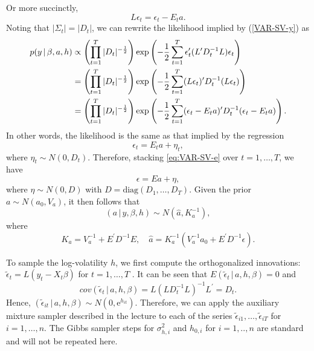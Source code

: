\documentclass{article}
\begin{document}
Or more succinctly, 
\begin{equation*}
L\epsilon _{t}=\epsilon _{t}-E_{t}a.
\end{equation*}%
Noting that $|\Sigma _{t}|=|D_{t}|$, we can rewrite the likelihood implied
by (\ref{VAR-SV-y}) as 
\begin{align*}
p(y\,|\,\beta ,a,h)& \propto \left( \prod_{t=1}^{T}|D_{t}|^{-\frac{1}{2}%
}\right) \exp \left( -\frac{1}{2}\sum_{t=1}^{T}\epsilon _{t}^{\prime
}(L^{\prime }D_{t}^{-1}L)\epsilon _{t}\right) \\
& =\left( \prod_{t=1}^{T}|D_{t}|^{-\frac{1}{2}}\right) \exp \left( -\frac{1}{%
2}\sum_{t=1}^{T}(L\epsilon _{t})^{\prime }D_{t}^{-1}(L\epsilon _{t})\right)
\\
& =\left( \prod_{t=1}^{T}|D_{t}|^{-\frac{1}{2}}\right) \exp \left( -\frac{1}{%
2}\sum_{t=1}^{T}(\epsilon _{t}-E_{t}a)^{\prime }D_{t}^{-1}(\epsilon
_{t}-E_{t}a)\right) .
\end{align*}%
In other words, the likelihood is the same as that implied by the regression 
\begin{equation}
\epsilon _{t}=E_{t}a+\eta _{t},  \label{eq:VAR-SV-e}
\end{equation}%
where $\eta _{t}\sim N(0,D_{t}).$ Therefore, stacking \eqref{eq:VAR-SV-e}
over $t=1,\ldots ,T$, we have 
\begin{equation*}
\epsilon =Ea+\eta ,
\end{equation*}%
where $\eta \sim N(0,D)$ with $D=\text{diag}(D_{1},\ldots ,D_{T})$. Given
the prior $a\sim N(a_{0},V_{a})$, it then follows that 
\begin{equation*}
(a\,|\,y,\beta ,h)\sim N(\hat{a},K_{a}^{-1}),
\end{equation*}%
where 
\begin{equation*}
K_{a}=V_{a}^{-1}+E^{\prime }D^{-1}E,\quad \hat{a}=K_{a}^{-1}\left(
V_{a}^{-1}a_{0}+E^{\prime }D^{-1}\epsilon \right) .
\end{equation*}

To sample the log-volatility $h$, we first compute the orthogonalized
innovations: $\tilde{\epsilon}_{t}=L(y_{t}-X_{t}\beta )$ for $t=1,\ldots ,T$%
. It can be seen that $E(\tilde{\epsilon}_{t}\,|\,a,h,\beta )=0$ and 
\begin{equation*}
cov(\tilde{\epsilon}_{t}\,|\,a,h,\beta )=L(LD_{t}^{-1}L)^{-1}L^{\prime
}=D_{t}.
\end{equation*}%
Hence, $(\tilde{\epsilon}_{it}\,|\,a,h,\beta )\sim N(0,\text{e}^{h_{it}}).$
Therefore, we can apply the auxiliary mixture sampler described in the
lecture to each of the series $\tilde{\epsilon}_{i1},\ldots ,\tilde{\epsilon}%
_{iT}$ for $i=1,\ldots ,n$. The Gibbs sampler steps for $\sigma _{h,i}^{2}$
and $h_{0,i}$ for $i=1,..,n$ are standard and will not be repeated here.
\end{document}
